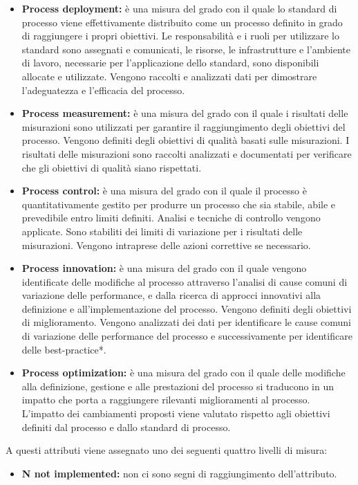 \documentclass[11pt,a4paper]{article}
\begin{document}
{\begin{itemize}
	\item \textbf{Process deployment:} è una misura del grado con il quale lo standard di processo viene effettivamente distribuito come un processo definito in grado di raggiungere i propri obiettivi. Le responsabilità e i ruoli per utilizzare lo standard sono assegnati e comunicati, le risorse, le infrastrutture e l'ambiente di lavoro, necessarie per l'applicazione dello standard, sono disponibili allocate e utilizzate. Vengono raccolti e analizzati dati per dimostrare l'adeguatezza e l'efficacia del processo.
	\item \textbf{Process measurement:} è una misura del grado con il quale i risultati delle misurazioni sono utilizzati per garantire il raggiungimento degli obiettivi del processo. Vengono definiti degli obiettivi di qualità basati sulle misurazioni. I risultati delle misurazioni sono raccolti analizzati e documentati per verificare che gli obiettivi di qualità siano rispettati.
	\item \textbf{Process control:} è una misura del grado con il quale il processo è quantitativamente gestito per produrre un processo che sia stabile, abile e prevedibile entro limiti definiti. Analisi e tecniche di controllo vengono applicate. Sono stabiliti dei limiti di variazione per i risultati delle misurazioni. Vengono intraprese delle azioni correttive se necessario. 
	\item \textbf{Process innovation:} è una misura del grado con il quale vengono identificate delle modifiche al processo attraverso l'analisi di cause comuni di variazione delle performance, e dalla ricerca di approcci innovativi alla definizione e all'implementazione del processo. Vengono definiti degli obiettivi di miglioramento. Vengono analizzati dei dati per identificare le cause comuni di variazione delle performance del processo e successivamente per identificare delle best-practice*.
	\item \textbf{Process optimization:} è una misura del grado con il quale delle modifiche alla definizione, gestione e alle prestazioni del processo si traducono in un impatto che porta a raggiungere rilevanti miglioramenti al processo. L'impatto dei cambiamenti proposti viene valutato rispetto agli obiettivi definiti dal processo e dallo standard di processo.
	\end{itemize}
	A questi attributi viene assegnato uno dei seguenti quattro livelli di misura:
	\begin{itemize}
	\item \textbf{N not implemented:} non ci sono segni di raggiungimento dell'attributo.

\end{itemize}}
\end{document}
